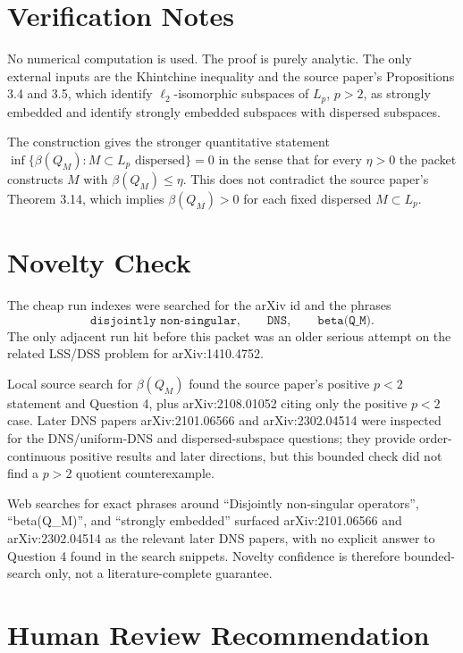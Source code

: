 \documentclass[11pt]{article}
\begin{document}
\section*{Verification Notes}

No numerical computation is used. The proof is purely analytic. The only external inputs are the Khintchine inequality and the source paper's Propositions 3.4 and 3.5, which identify \(\ell_2\)-isomorphic subspaces of \(L_p\), \(p>2\), as strongly embedded and identify strongly embedded subspaces with dispersed subspaces.

The construction gives the stronger quantitative statement \(\inf\{\beta(Q_M): M\subset L_p \text{ dispersed}\}=0\) in the sense that for every \(\eta>0\) the packet constructs \(M\) with \(\beta(Q_M)\leq\eta\). This does not contradict the source paper's Theorem 3.14, which implies \(\beta(Q_M)>0\) for each fixed dispersed \(M\subset L_p\).

\section*{Novelty Check}

The cheap run indexes were searched for the arXiv id and the phrases
\[
  \texttt{disjointly non-singular},\qquad \texttt{DNS},\qquad
  \texttt{beta(Q\_M)}.
\]
The only adjacent run hit before this packet was an older serious attempt on the related LSS/DSS problem for arXiv:1410.4752.

Local source search for \(\beta(Q_M)\) found the source paper's positive \(p<2\) statement and Question 4, plus arXiv:2108.01052 citing only the positive \(p<2\) case. Later DNS papers arXiv:2101.06566 and arXiv:2302.04514 were inspected for the DNS/uniform-DNS and dispersed-subspace questions; they provide order-continuous positive results and later directions, but this bounded check did not find a \(p>2\) quotient counterexample.

Web searches for exact phrases around ``Disjointly non-singular operators'', ``beta(Q\_M)'', and ``strongly embedded'' surfaced arXiv:2101.06566 and arXiv:2302.04514 as the relevant later DNS papers, with no explicit answer to Question 4 found in the search snippets. Novelty confidence is therefore bounded-search only, not a literature-complete guarantee.

\section*{Human Review Recommendation}
\end{document}
